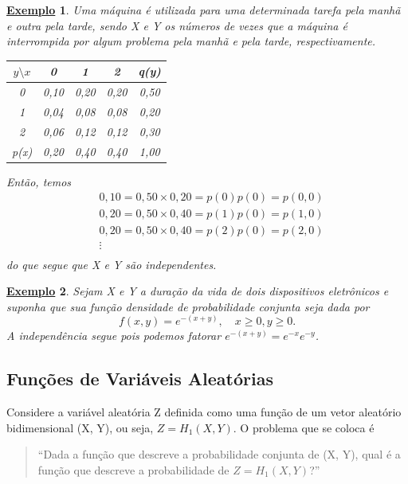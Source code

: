 \documentclass{article}
\newtheorem{example}{\underline{Exemplo}}
\begin{document}
\begin{example}
  Uma máquina é utilizada para uma determinada tarefa pela manhã e outra pela tarde, sendo X e Y os números
  de vezes que a máquina é interrompida por algum problema pela manhã e pela tarde, respectivamente. 

  \begin{center}
    \begin{table}[h!]
      \centering
      \begin{tabular}{| c | c  c  c | c |}
        \hline
        \(y\setminus x\) & 0 & 1 & 2 & q(y)\\
        \hline
        0 & 0,10 & 0,20 & 0,20 & 0,50 \\
        1 & 0,04 & 0,08 & 0,08 & 0,20 \\
        2 & 0,06 & 0,12 & 0,12 & 0,30\\ 
        \hline
        p(x) & 0,20 & 0,40 & 0,40 & 1,00\\
        \hline
      \end{tabular}
    \end{table}
    Então, temos 
    \begin{align*}
    &0,10 = 0,50\times 0,20 = p(0)p(0) = p(0, 0) \\
    &0,20 = 0,50\times 0,40 = p(1)p(0) = p(1, 0)\\
    &0,20 = 0,50\times 0,40 = p(2)p(0) = p(2, 0)\\
    &\vdots\\
    \end{align*}
    do que segue que X e Y são independentes.
  \end{center}
\end{example}
\begin{example}
  Sejam X e Y a duração da vida de dois dispositivos eletrônicos e suponha que sua função densidade de probabilidade conjunta seja dada por 
  \[
    f(x, y) = e^{-(x+y)},\quad x\geq 0,y\geq 0.
  \]
  A independência segue pois podemos fatorar \(e^{-(x+y)} = e^{-x}e^{-y}\).
\end{example}
\subsection{Funções de Variáveis Aleatórias}
Considere a variável aleatória Z definida como uma função de um vetor aleatório bidimensional (X, Y), ou seja, \(Z = H_{1}(X, Y).\)
O problema que se coloca é 
\begin{quote}
  ``Dada a função que descreve a probabilidade conjunta de (X, Y), qual é a função que descreve a probabilidade de \(Z = H_{1}(X, Y)\)?''
\end{quote}
\end{document}
